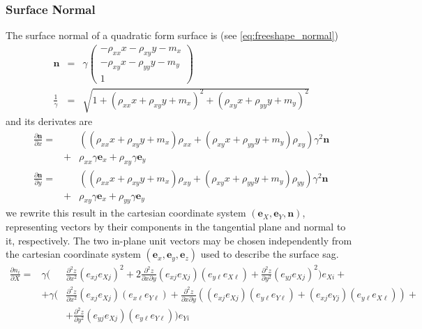 \documentclass[12pt,a4paper,twoside,openright,BCOR10mm,headsepline,titlepage,abstracton,chapterprefix,final]{scrreprt}
\newcommand\Vector[1]{{\mathbf{#1}}}
\begin{document}
\subsubsection{Surface Normal}
The surface normal of a quadratic form surface is (see \eqref{eq:freeshape_normal})
\begin{eqnarray}
 \Vector{n} &=& \gamma
 \begin{pmatrix}
  - \rho_{xx} x - \rho_{xy} y - m_x
  \\
  - \rho_{xy} x - \rho_{yy} y - m_y
  \\
  1
  \end{pmatrix}
  \\
  \frac{1}{\gamma} &=& \sqrt{ 1 + \left( \rho_{xx} x + \rho_{xy} y + m_x \right)^2 + \left( \rho_{xy} x + \rho_{yy} y + m_y \right)^2}
\end{eqnarray}
and its derivates are
\begin{eqnarray}
 \frac{\partial \Vector{n}}{\partial x} =&&
  \left(
     (\rho_{xx} x + \rho_{xy} y + m_x) \rho_{xx}
   + (\rho_{xy} x + \rho_{yy} y + m_y) \rho_{xy}
  \right)
  \gamma^2 \Vector{n}
  \nonumber\\
  &+&
  \rho_{xx} \gamma \Vector{e}_x
  +
  \rho_{xy} \gamma \Vector{e}_y
\\
 \frac{\partial \Vector{n}}{\partial y} =&&
  \left(
     (\rho_{xx} x + \rho_{xy} y + m_x) \rho_{xy}
   + (\rho_{xy} x + \rho_{yy} y + m_y) \rho_{yy}
  \right)
  \gamma^2 \Vector{n}
  \nonumber\\
  &+&
  \rho_{xy} \gamma \Vector{e}_x
  +
  \rho_{yy} \gamma \Vector{e}_y
\end{eqnarray}
we rewrite this result in the cartesian coordinate system $(\Vector{e}_X, \Vector{e}_Y, \Vector{n})$,
representing vectors by their components in the tangential plane and normal to it, respectively.
The two in-plane unit vectors may be chosen independently 
from the cartesian coordinate system $(\Vector{e}_x, \Vector{e}_y, \Vector{e}_z)$
used to describe the surface sag.
\begin{eqnarray}
 \frac{\partial n_i}{\partial X} = &\gamma \Bigg(&
     \frac{\partial^2 z}{\partial x^2} 
     (e_{xj} e_{Xj})^2
   +2\frac{\partial^2 z}{\partial x \partial y}
     (e_{xj} e_{Xj})(e_{y\ell}e_{X\ell})
   + \frac{\partial^2 z}{\partial y^2}
     (e_{yj}e_{Xj})^2
 \Bigg) e_{Xi} +
\nonumber\\
 &+ \gamma \Bigg(&
     \frac{\partial^2 z}{\partial x^2}
     (e_{xj} e_{Xj})(e_{x\ell}e_{Y\ell})
   + \frac{\partial^2 z}{\partial x \partial y}
     \left( (e_{xj} e_{Xj})(e_{y\ell}e_{Y\ell}) + (e_{xj} e_{Yj})(e_{y\ell}e_{X\ell}) \right) + 
 \nonumber\\
  &&
   + \frac{\partial^2 z}{\partial y^2}
     (e_{yj}e_{Xj})(e_{y\ell}e_{Y\ell})
 \Bigg) e_{Yi}
 \label{eq:derivative_of_surface_normal_in_XY_coordinates}
\end{eqnarray}
\end{document}
